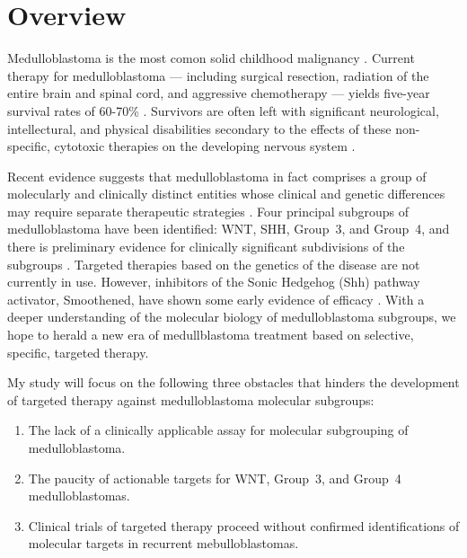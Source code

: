 \documentclass[11pt,letterpaper]{article}
\theoremstyle{definition}
\begin{document}


\section{Overview}

Medulloblastoma is the most comon solid childhood malignancy . Current therapy for medulloblastoma --- including surgical resection, radiation of the entire brain and spinal cord, and aggressive chemotherapy --- yields five-year survival rates of 60-70\% . Survivors are often left with significant neurological, intellectural, and physical disabilities secondary to the effects of these non-specific, cytotoxic therapies on the developing nervous system .

Recent evidence suggests that medulloblastoma in fact comprises a group of molecularly and clinically distinct entities whose clinical and genetic differences may require separate therapeutic strategies . Four principal subgroups of medulloblastoma have been identified: WNT, SHH, Group~3, and Group~4, and there is preliminary evidence for clinically significant subdivisions of the subgroups . Targeted therapies based on the genetics of the disease are not currently in use. However, inhibitors of the Sonic Hedgehog (Shh) pathway activator, Smoothened, have shown some early evidence of efficacy . With a deeper understanding of the molecular biology of medulloblastoma subgroups, we hope to herald a new era of medullblastoma treatment based on selective, specific, targeted therapy.

My study will focus on the following three obstacles that hinders the development of targeted therapy against medulloblastoma molecular subgroups:

\begin{enumerate}
	\item The lack of a clinically applicable assay for molecular subgrouping of medulloblastoma.
	\item The paucity of actionable targets for WNT, Group~3, and Group~4 medulloblastomas.
	\item Clinical trials of targeted therapy proceed without confirmed identifications of molecular targets in recurrent mebulloblastomas.
\end{enumerate}
\end{document}
